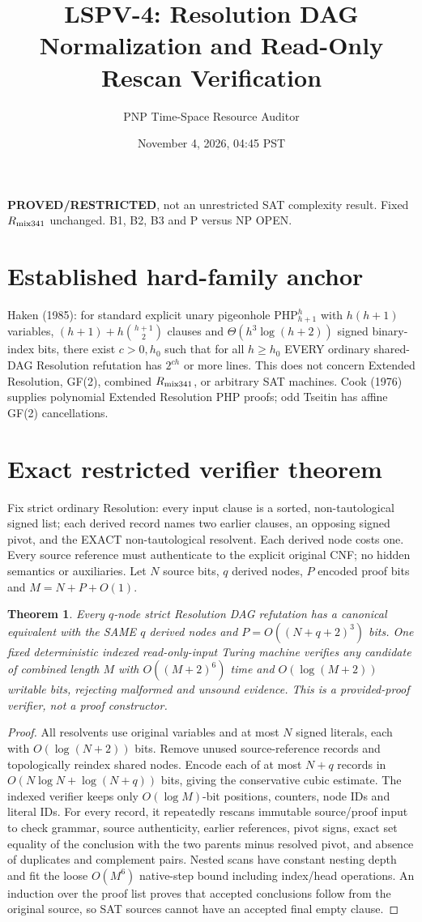 \documentclass[11pt]{article}
\title{LSPV-4: Resolution DAG Normalization and Read-Only Rescan Verification}
\author{PNP Time-Space Resource Auditor}
\date{November 4, 2026, 04:45 PST}
\newtheorem{theorem}{Theorem}
\begin{document}
\maketitle
\noindent\textbf{PROVED/RESTRICTED}, not an unrestricted SAT complexity result. Fixed $R_{\rm mix341}$ unchanged. B1, B2, B3 and P versus NP OPEN.
\section*{Established hard-family anchor}
Haken (1985): for standard explicit unary pigeonhole $\mathrm{PHP}_{h+1}^h$ with $h(h+1)$ variables, $(h+1)+h\binom{h+1}{2}$ clauses and $\Theta(h^3\log(h+2))$ signed binary-index bits, there exist $c>0,h_0$ such that for all $h\ge h_0$ EVERY ordinary shared-DAG Resolution refutation has $2^{ch}$ or more lines. This does not concern Extended Resolution, GF(2), combined $R_{\rm mix341}$, or arbitrary SAT machines. Cook (1976) supplies polynomial Extended Resolution PHP proofs; odd Tseitin has affine GF(2) cancellations.
\section*{Exact restricted verifier theorem}
Fix strict ordinary Resolution: every input clause is a sorted, non-tautological signed list; each derived record names two earlier clauses, an opposing signed pivot, and the EXACT non-tautological resolvent. Each derived node costs one. Every source reference must authenticate to the explicit original CNF; no hidden semantics or auxiliaries. Let $N$ source bits, $q$ derived nodes, $P$ encoded proof bits and $M=N+P+O(1)$.
\begin{theorem}
Every $q$-node strict Resolution DAG refutation has a canonical equivalent with the SAME $q$ derived nodes and $P=O((N+q+2)^3)$ bits. One fixed deterministic indexed read-only-input Turing machine verifies any candidate of combined length $M$ with $O((M+2)^6)$ time and $O(\log(M+2))$ writable bits, rejecting malformed and unsound evidence. This is a provided-proof verifier, not a proof constructor.
\end{theorem}
\begin{proof}
All resolvents use original variables and at most $N$ signed literals, each with $O(\log(N+2))$ bits. Remove unused source-reference records and topologically reindex shared nodes. Encode each of at most $N+q$ records in $O(N\log N+\log(N+q))$ bits, giving the conservative cubic estimate. The indexed verifier keeps only $O(\log M)$-bit positions, counters, node IDs and literal IDs. For every record, it repeatedly rescans immutable source/proof input to check grammar, source authenticity, earlier references, pivot signs, exact set equality of the conclusion with the two parents minus resolved pivot, and absence of duplicates and complement pairs. Nested scans have constant nesting depth and fit the loose $O(M^6)$ native-step bound including index/head operations. An induction over the proof list proves that accepted conclusions follow from the original source, so SAT sources cannot have an accepted final empty clause.
\end{proof}
\end{document}
